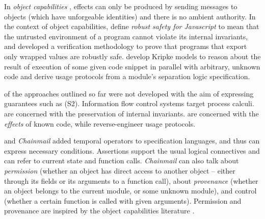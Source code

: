 In   \emph{object capabilities} \cite{MillerPhD},
effects can only be produced by sending messages to objects (which have unforgeable identities) and  there
is no ambient authority.
In the context of object capabilities,  define  \emph{robust safety for Javascript}  
to mean that the untrusted environment of a program cannot violate 
its internal invariants, and developed  a verification methodology   to 
prove   that programs that  export only %
wrapped values  are robustly safe.
 develop Kripke models to reason about 
the result of execution of some given code snippet in parallel
with arbitrary, unknown code and
 derive usage protocols from a module's
separation logic specification.

 of the approaches outlined so far were not developed with
 the aim of expressing guarantees such as (S2).
   Information flow control systems target process calculi. %
 \citeauthor{ddd} are concerned with the preservation of
 internal invariants. \citeauthor{dd} are
 concerned with the \emph{effects} of known code,
 while \citeauthor{threoremsFreeSep}  reverse-engineer usage protocols.
 
{}  \cite{VerX}  and   \emph{Chainmail}  \cite{FASE} 
 added temporal operators to specification languages, and thus can express necessary conditions.  
 Assertions support the usual 
   logical connectives and can refer to current state and function calls.
 \emph{Chainmail} 
 can also talk about \emph{permission} (whether an
 object has direct access to another object -- either through its fields or 
its arguments to a function call),    about \emph{provenance} (whether an object
 belongs to the current module, or some %
 unknown module),
{and control (whether a certain function is called with given arguments).}
Permission and provenance are inspired by the object capabilities
 literature \cite{MillerPhD}. 
 
 
